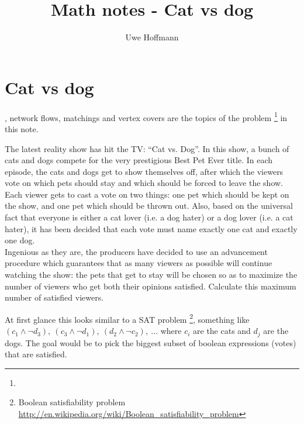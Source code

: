 

\title{Math notes - Cat vs dog}
\author{Uwe Hoffmann}



\setcounter{chapter}{1}
\section*{Cat vs dog}

, network flows, matchings and vertex covers are the topics of the problem \footnote{} in this note.

\begin{fullwidth}

\vspace{10 mm}
\begin{problem}
The latest reality show has hit the TV: “Cat vs. Dog”. In this show, a bunch of cats and dogs compete for the very prestigious Best Pet Ever title. In each episode, the cats and dogs get to show themselves off, after which the viewers vote on which pets should stay and which should be forced to leave the show.
\\

Each viewer gets to cast a vote on two things: one pet which should be kept on the show, and one pet which should be thrown out. Also, based on the universal fact that everyone is either a cat lover (i.e. a dog hater) or a dog lover (i.e. a cat hater), it has been decided that each vote must name exactly one cat and exactly one dog.
\\

Ingenious as they are, the producers have decided to use an advancement procedure which guarantees that as many viewers as possible will continue watching the show: the pets that get to stay will be chosen so as to maximize the number of viewers who get both their opinions satisfied. Calculate this maximum number of satisfied viewers.
\end{problem}

\end{fullwidth}

At first glance this looks similar to a SAT problem \footnote{Boolean satisfiability problem \url{http://en.wikipedia.org/wiki/Boolean_satisfiability_problem}}, something like $(c_1 \land \lnot d_3),\  (c_3 \land \lnot d_1),\  (d_2 \land \lnot c_2),\ \dots$ where $c_i$ are the cats and $d_j$ are the dogs. The goal would be to pick the biggest subset of boolean expressions (votes) that are satisfied.


